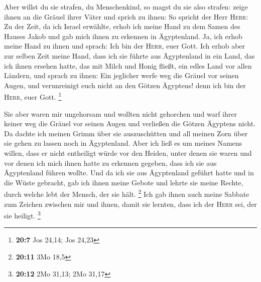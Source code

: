  Aber willst du sie strafen, du Menschenkind, so magst du
sie also strafen: zeige ihnen an die Gräuel ihrer Väter 
und sprich zu ihnen: So spricht der Herr \textsc{Herr}: Zu der Zeit, da
ich Israel erwählte, erhob ich meine Hand zu dem Samen des Hauses Jakob
und gab mich ihnen zu erkennen in Ägyptenland. Ja, ich erhob meine Hand
zu ihnen und sprach: Ich bin der \textsc{Herr}, euer Gott.
 Ich erhob aber zur selben Zeit meine Hand, dass ich sie
führte aus Ägyptenland in ein Land, das ich ihnen ersehen hatte, das mit
Milch und Honig fließt, ein edles Land vor allen Ländern, 
und sprach zu ihnen: Ein jeglicher werfe weg die Gräuel vor seinen
Augen, und verunreinigt euch nicht an den Götzen Ägyptens! denn ich bin
der \textsc{Herr}, euer Gott. \footnote{\textbf{20:7} Jos 24,14; Jos
  24,23}

 Sie aber waren mir ungehorsam und wollten nicht gehorchen
und warf ihrer keiner weg die Gräuel vor seinen Augen und verließen die
Götzen Ägyptens nicht. Da dachte ich meinen Grimm über sie auszuschütten
und all meinen Zorn über sie gehen zu lassen noch in Ägyptenland.
 Aber ich ließ es um meines Namens willen, dass er nicht
entheiligt würde vor den Heiden, unter denen sie waren und vor denen ich
mich ihnen hatte zu erkennen gegeben, dass ich sie aus Ägyptenland
führen wollte.  Und da ich sie aus Ägyptenland geführt
hatte und in die Wüste gebracht,  gab ich ihnen meine
Gebote und lehrte sie meine Rechte, durch welche lebt der Mensch, der
sie hält. \footnote{\textbf{20:11} 3Mo 18,5}  Ich gab
ihnen auch meine Sabbate zum Zeichen zwischen mir und ihnen, damit sie
lernten, dass ich der \textsc{Herr} sei, der sie heiligt. \footnote{\textbf{20:12}
  2Mo 31,13; 2Mo 31,17}

